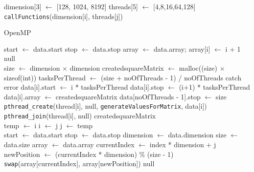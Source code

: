 \documentclass[10pt,twocolumn]{witseiepaper}
\begin{document}
\begin{appendix}
\begin{algorithm}[htbp]
\begin{algorithmic}
		\State dimension[3] $\leftarrow$ [128, 1024, 8192]
		\State threads[5] $\leftarrow$ [4,8,16,64,128]
		\State \verb|callFunctions|(dimension[i], threads[j])
		\EndFor
		\EndFor
		\State {}
		\EndFunction
		
		\caption{OpenMP}
		\label{alg:1}
	\end{algorithmic}
\end{algorithm}

\begin{algorithm}[htbp]
	\begin{algorithmic}
		\State start $\leftarrow$ data.start
		\State stop $\leftarrow$ data.stop
		\State array $\leftarrow$ data.array;
		\State array[i] $\leftarrow$ i + 1
		\EndFor
		\State \Return null
		\EndFunction \\
		
		\State size $\leftarrow$ dimension $\times$ dimension
		\State created\textunderscore squareMatrix $\leftarrow$ malloc((size) $\times$ sizeof(int))
		\State tasksPerThread $\leftarrow$ (size + noOfThreads - 1) / noOfThreads
		\State catch error
		\EndIf
		\State data[i].start $\leftarrow$ i * tasksPerThread
		\State data[i].stop $\leftarrow$ (i+1) * tasksPerThread
		\State data[i].array $\leftarrow$ created\textunderscore squareMatrix
		\EndFor
		\State data[noOfThreads - 1].stop $\leftarrow$ size
		\State  \verb|pthread_create|(thread[i], null, \verb|generateValuesForMatrix|, data[i])
		\EndFor
		\State  \verb|pthread_join|(thread[i], null)
		\EndFor
		\EndFunction
		\State \Return created\textunderscore squareMatrix \\
		
		\State temp $\leftarrow$ i
		\State i $\leftarrow$ j
		\State j $\leftarrow$ temp
		\EndFunction \\
		
		\State start $\leftarrow$ data.start
		\State stop $\leftarrow$ data.stop
		\State dimension $\leftarrow$ data.dimension
		\State size $\leftarrow$ data.size
		\State array $\leftarrow$ data.array
		\State currentIndex $\leftarrow$ index * dimension + j
		\State newPosition $\leftarrow$ (currentIndex * dimension) \% (size - 1)
		\State \verb|swap|(array[currentIndex], array[newPosition])
		\EndFor
		\EndFor
		\State \Return null
		\EndFunction \\
		

\end{algorithmic}
\end{algorithm}
\end{appendix}
\end{document}
